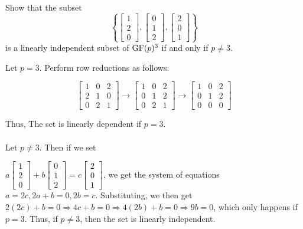 \begin{ProbBox} %
\begin{problem}[Golan 177]
Show that the subset
\[
\left\{ 
\begin{bmatrix}
  1\\[0.3em] 2\\[0.3em] 0
\end{bmatrix},
\begin{bmatrix}
  0\\[0.3em] 1\\[0.3em] 2
\end{bmatrix},
\begin{bmatrix}
  2\\[0.3em] 0\\[0.3em] 1
\end{bmatrix}
\right\}
\]
is a linearly independent subset of $\operatorname{GF}(p)^3$ if and only if $p\neq 3$.
\end{problem}
\smallskip
\begin{solution}
Let $p=3$. Perform row reductions as follows:

\[ \left[ \begin{array}{ccc}
1 & 0 & 2 \\
2 & 1 & 0 \\
0 & 2 & 1
\end{array} \right]
%
\rightarrow
%
\left[ \begin{array}{ccc}
1 & 0 & 2 \\
0 & 1 & 2 \\
0 & 2 & 1
\end{array} \right]
%
\rightarrow
%
\left[ \begin{array}{ccc}
1 & 0 & 2 \\
0 & 1 & 2 \\
0 & 0 & 0
\end{array} \right]
\]

Thus, The set is linearly dependent if $p=3$. \\ \\

Let $p \neq 3$. Then if we set 

$a\begin{bmatrix}
  1\\[0.3em] 2\\[0.3em] 0
\end{bmatrix}
+
b\begin{bmatrix}
  0\\[0.3em] 1\\[0.3em] 2
\end{bmatrix}
=
c\begin{bmatrix}
  2\\[0.3em] 0\\[0.3em] 1
\end{bmatrix}$, we get the system of equations $a=2c, 2a+b=0, 2b=c$. Substituting, we then get $2(2c)+b=0 \Rightarrow 4c+b=0 \Rightarrow 4(2b)+b=0 \Rightarrow 9b=0$, which only happens if $p=3$. Thus, if $p \neq 3$, then the set is linearly independent. 

\end{solution}
\end{ProbBox}
\probskip

